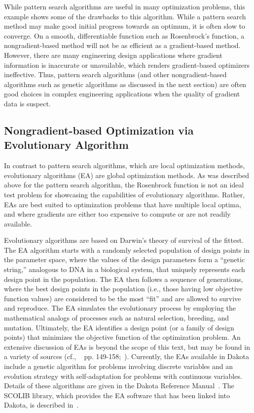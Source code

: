 While pattern search algorithms are useful in many optimization
problems, this example shows some of the drawbacks to this algorithm.
While a pattern search method may make good initial progress towards
an optimum, it is often slow to converge. On a smooth, differentiable
function such as Rosenbrock's function, a nongradient-based method
will not be as efficient as a gradient-based method. However, there
are many engineering design applications where gradient information is
inaccurate or unavailable, which renders gradient-based optimizers
ineffective. Thus, pattern search algorithms (and other
nongradient-based algorithms such as genetic algorithms as discussed in the
next section) are often good choices in complex engineering applications
when the quality of gradient data is suspect.

\subsection{Nongradient-based Optimization via Evolutionary Algorithm}\label{opt:examples:ea}

In contrast to pattern search algorithms, which are local optimization
methods, evolutionary algorithms (EA) are global optimization
methods. As was described above for the pattern search algorithm, the
Rosenbrock function is not an ideal test problem for showcasing the
capabilities of evolutionary algorithms. Rather, EAs are best suited
to optimization problems that have multiple local optima, and where
gradients are either too expensive to compute or are not readily available.

Evolutionary algorithms are based on Darwin's theory of survival of
the fittest. The EA algorithm starts with a randomly selected
population of design points in the parameter space, where the values
of the design parameters form a ``genetic string,'' analogous
to DNA in a biological system, that uniquely represents each design
point in the population. The EA then follows a sequence of
generations, where the best design points in the population (i.e.,
those having low objective function values) are considered to be the
most ``fit'' and are allowed to survive and reproduce. The EA
simulates the evolutionary process by employing the mathematical
analogs of processes such as natural selection, breeding, and
mutation. Ultimately, the EA identifies a design point (or a family of
design points) that minimizes the objective function of the
optimization problem. An extensive discussion of EAs is beyond the
scope of this text, but may be found in a variety of sources (cf.,
~\cite{Haf92} pp. 149-158;~\cite{Gol89}). Currently, the EAs available
in Dakota include a genetic algorithm for problems involving discrete
variables and an evolution strategy with self-adaptation for problems
with continuous variables. Details of these algorithms are given in
the Dakota Reference Manual~\cite{RefMan}. The SCOLIB library, which
provides the EA software that has been linked into Dakota, is
described in~\cite{Har06}.

